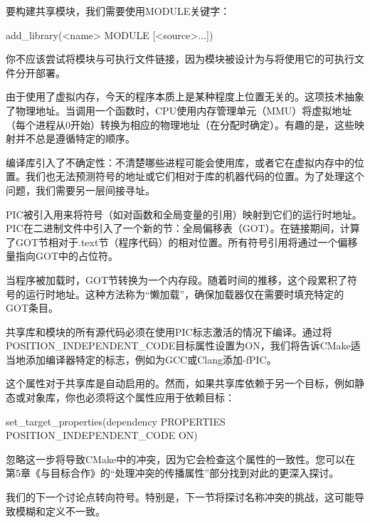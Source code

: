 要构建共享模块，我们需要使用MODULE关键字：

\begin{shell}
add_library(<name> MODULE [<source>...])
\end{shell}

你不应该尝试将模块与可执行文件链接，因为模块被设计为与将使用它的可执行文件分开部署。


由于使用了虚拟内存，今天的程序本质上是某种程度上位置无关的。这项技术抽象了物理地址。当调用一个函数时，CPU使用内存管理单元（MMU）将虚拟地址（每个进程从0开始）转换为相应的物理地址（在分配时确定）。有趣的是，这些映射并不总是遵循特定的顺序。

编译库引入了不确定性：不清楚哪些进程可能会使用库，或者它在虚拟内存中的位置。我们也无法预测符号的地址或它们相对于库的机器代码的位置。为了处理这个问题，我们需要另一层间接寻址。

PIC被引入用来将符号（如对函数和全局变量的引用）映射到它们的运行时地址。PIC在二进制文件中引入了一个新的节：全局偏移表（GOT）。在链接期间，计算了GOT节相对于.text节（程序代码）的相对位置。所有符号引用将通过一个偏移量指向GOT中的占位符。

当程序被加载时，GOT节转换为一个内存段。随着时间的推移，这个段累积了符号的运行时地址。这种方法称为“懒加载”，确保加载器仅在需要时填充特定的GOT条目。

共享库和模块的所有源代码必须在使用PIC标志激活的情况下编译。通过将POSITION\_INDEPENDENT\_CODE目标属性设置为ON，我们将告诉CMake适当地添加编译器特定的标志，例如为GCC或Clang添加-fPIC。

这个属性对于共享库是自动启用的。然而，如果共享库依赖于另一个目标，例如静态或对象库，你也必须将这个属性应用于依赖目标：

\begin{shell}
set_target_properties(dependency
                      PROPERTIES POSITION_INDEPENDENT_CODE ON)
\end{shell}

忽略这一步将导致CMake中的冲突，因为它会检查这个属性的一致性。您可以在第5章《与目标合作》的“处理冲突的传播属性”部分找到对此的更深入探讨。

我们的下一个讨论点转向符号。特别是，下一节将探讨名称冲突的挑战，这可能导致模糊和定义不一致。











